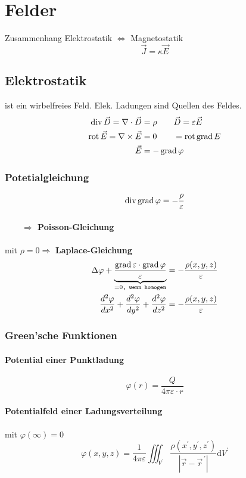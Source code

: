 \section{Felder}
Zusammenhang Elektrostatik $\Leftrightarrow$ Magnetostatik\\
\[ \vec{J} = \kappa \vec{E} \]

\subsection{Elektrostatik}
ist ein wirbelfreies Feld. Elek. Ladungen sind Quellen des Feldes.
\begin{align*}
    \operatorname{div} \vec{D} = \nabla \cdot \vec{D}  & = \rho       \qquad          \vec{D} = \varepsilon \vec{E} \\
    \operatorname{rot} \vec{E} = \nabla \times \vec{E} & = 0          \qquad          = \operatorname{rot} \operatorname{grad} E            \\
    \vec{E}                                & =- \operatorname{grad} \varphi
\end{align*}
\subsubsection{Potetialgleichung}
\[
    \operatorname{div} \operatorname{grad} \varphi = - \dfrac{\rho}{\varepsilon}
\]
\paragraph{$\qquad \Rightarrow$ Poisson-Gleichung}
mit $\rho = 0 \Rightarrow$ \textbf{Laplace-Gleichung}
\begin{align*}
    \Delta \varphi + \underbrace{ \dfrac{\operatorname{grad} \varepsilon \cdot \operatorname{grad} \varphi}{\varepsilon}}_{= 0\texttt{, wenn homogen}}
     & = - \dfrac{\rho (x, y, z)}{\varepsilon} \\
    \frac{d^2 \varphi}{d x^2} + \frac{d^2 \varphi}{d y^2} + \frac{d^2 \varphi}{d z^2}
     & = - \dfrac{\rho (x, y, z)}{\varepsilon}
\end{align*}

\subsubsection{Green'sche Funktionen}
\paragraph*{Potential einer Punktladung}
\[ \varphi (r) = \dfrac{Q}{4 \pi \varepsilon \cdot r}\]

\paragraph*{Potentialfeld einer Ladungsverteilung}
mit $\varphi(\infty)=0$
\[\varphi(x, y, z)=\frac{1}{4 \pi \varepsilon} \iiint_{V^{\prime}} \frac{\rho\left(x^{\prime}, y^{\prime}, z^{\prime}\right)}{\left|\vec{r}-\vec{r}^{\,\prime}\right|} \mathrm{d} V^{\prime}\]

